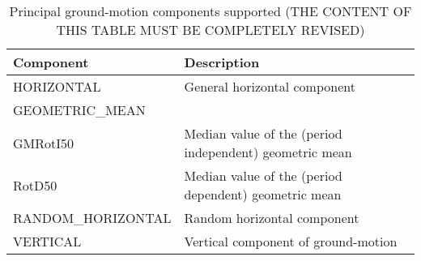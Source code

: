 \begin{table}[!h]
\centering
\begin{tabular}{|p{6cm}p{7cm}|}
\hline
\rowcolor{anti-flashwhite}
\bf{Component} & \bf{Description} \\
\hline 
HORIZONTAL & General horizontal component \\
GEOMETRIC\_MEAN &  \\
GMRotI50 & Median value of the (period independent) geometric mean 
           \parencite{boore2006} \\
RotD50 & Median value of the (period dependent) geometric mean 
         \parencite{boore2010} \\
RANDOM\_HORIZONTAL & Random horizontal component \\
VERTICAL & Vertical component of ground-motion\\
\hline
\end{tabular}
\caption{Principal ground-motion components supported (THE CONTENT OF THIS 
TABLE MUST BE COMPLETELY REVISED)}
\label{tab:hor_comp} 
\end{table}
